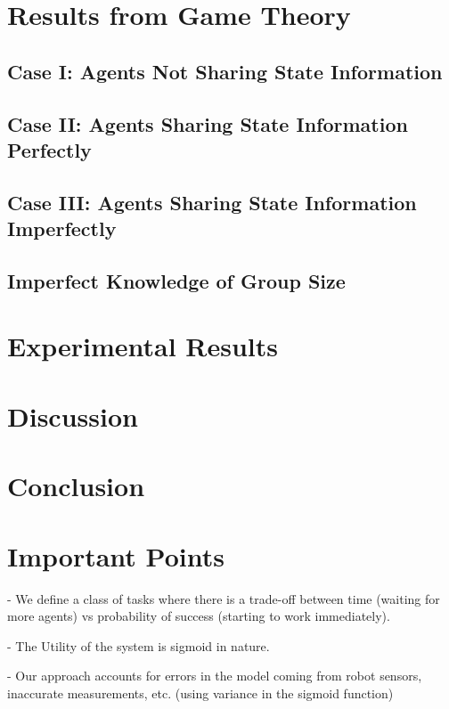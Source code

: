 \documentclass[conference]{IEEETran}
\begin{document}
\section{Results from Game Theory}
\subsection{Case I: Agents Not Sharing State Information}

\subsection{Case II: Agents Sharing State Information Perfectly}

\subsection{Case III: Agents Sharing State Information Imperfectly}

\subsection{Imperfect Knowledge of Group Size}




\section{Experimental Results}




\section{Discussion}




\section{Conclusion}



\section{Important Points}
- We define a class of tasks where there is a trade-off between time (waiting for more agents) vs probability of success (starting to work immediately).

- The Utility of the system is sigmoid in nature.

- Our approach accounts for errors in the model coming from robot sensors, inaccurate measurements, etc. (using variance in the sigmoid function)
\end{document}
